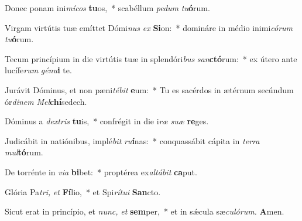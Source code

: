 \item Donec ponam ini\textit{mícos} \textbf{tu}os,~* scabéllum \textit{pedum} \textit{tu}\textbf{ó}rum.
\item Virgam virtútis tuæ emíttet Dómi\textit{nus} \textit{ex} \textbf{Si}on:~* domináre in médio inimi\hspace*{0.03em}\textit{córum} \textit{tu}\textbf{ó}rum.
\item Tecum princípium in die virtútis tuæ in splendóri\textit{bus} \textit{san}\textbf{ctó}rum:~* ex útero ante lucífe\textit{rum} \textit{génu}\textbf{i} te.
\item Jurávit Dóminus, et non pæni\hspace*{0.03em}\textit{tébit} \textbf{e}um:~* Tu es sacérdos in ætérnum secúndum ór\textit{dinem} \textit{Mel}\textbf{chí}sedech.
\item Dóminus a \textit{dextris} \textbf{tu}is,~* confrégit in die i\hspace*{0.03em}\textit{ræ} \textit{suæ} \textbf{re}ges.
\item Judicábit in natiónibus, implé\textit{bit} \textit{ru}\textbf{í}nas:~* conquassábit cápita in \textit{terra} \textit{mul}\textbf{tó}rum.
\item De torrénte in \textit{via} \textbf{bi}bet:~* proptérea ex\hspace*{0.03em}\textit{altábit} \textbf{ca}put.
\item Glória Pa\hspace*{0.03em}\textit{tri,} \textit{et} \textbf{Fí}lio,~* et Spi\hspace*{0.03em}\textit{rítui} \textbf{San}cto.
\item Sicut erat in princípio, et \textit{nunc,} \textit{et} \textbf{sem}per,~* et in sǽcula sæ\hspace*{0.03em}\textit{culórum.} \textbf{A}men.